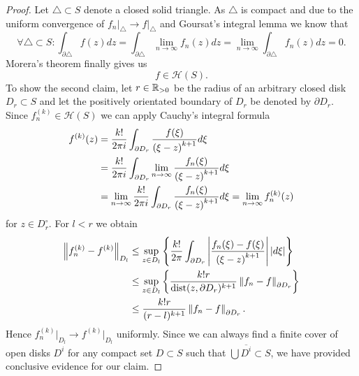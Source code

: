 \begin{proof}
	Let $\triangle \subset S$ denote a closed solid triangle. As $\triangle$ is compact and due to the uniform convergence of $f_n\big\vert _\triangle \to f\big\vert _\triangle$ and Goursat’s integral lemma we know that
\begin{equation*}
	\forall \triangle \subset S \colon \int_{\partial \triangle} f(z) dz = \int_{\partial \triangle} \lim\limits_{n \to \infty} f_n(z) dz	= \lim\limits_{n \to \infty}\int_{\partial \triangle} f_n(z) dz = 0.
\end{equation*}
	 Morera's theorem finally gives us
\begin{equation*}
	f \in \mathcal{H}(S).
\end{equation*}
	To show the second claim, let $r \in \mathbb{R}_{> 0}$ be the radius of an arbitrary closed disk $D_r \subset S$ and let the positively orientated boundary of $D_r$ be denoted by $\partial D_r$. Since $f_n^{(k)} \in \mathcal{H}(S)$ we can apply Cauchy's integral formula
\begin{equation*}
\begin{aligned}
	f^{(k)}(z)
	&= \frac{k!}{2 \pi i} \int _{\partial D_r} \frac{f(\xi)}{\left(\xi - z\right)^{k + 1}} d\xi \\
	&= \frac{k!}{2 \pi i} \int _{\partial D_r} \lim\limits_{n \to \infty} \frac{f_n(\xi)}{\left(\xi - z\right)^{k + 1}} d\xi \\
	&= \lim\limits_{n \to \infty} \frac{k!}{2 \pi i} \int _{\partial D_r} \frac{f_n(\xi)}{\left(\xi - z\right)^{k + 1}} d\xi
	= \lim\limits_{n \to \infty} f_n^{(k)}(z)
\end{aligned}
\end{equation*}
	for $z \in D_r^\circ$. For $l < r$ we obtain
\begin{equation*}
\begin{aligned}
	\left\lVert f_n^{(k)} - f^{(k)}\right\rVert_{D_l}
	&\leq \sup\limits_{z \in D_l} \left\{\frac{k!}{2 \pi} \int _{\partial D_r}\left|\frac{f_n(\xi) - f(\xi)}{\left(\xi - z\right)^{k + 1}}\right| \left|d\xi\right|\right\} \\
	&\leq \sup\limits_{z \in D_l} \left\{\frac{k! r}{\operatorname{\text{dist}}(z, \partial D_r)^{k + 1}} \left\lVert f_n - f\right\rVert_{\partial D_r}\right\} \\
	&\leq \frac{k! r}{(r - l)^{k + 1}} \left\lVert f_n - f\right\rVert_{\partial D_r}.
\end{aligned}
\end{equation*}
	Hence $f_n^{(k)}\big\vert _{D_l} \to f^{(k)}\big\vert _{D_l}$ uniformly. Since we can always find a finite cover of open disks $D^i$ for any compact set $D \subset S$ such that $\bigcup \overline{D^i} \subset S$, we have provided conclusive evidence for our claim.
\end{proof}


